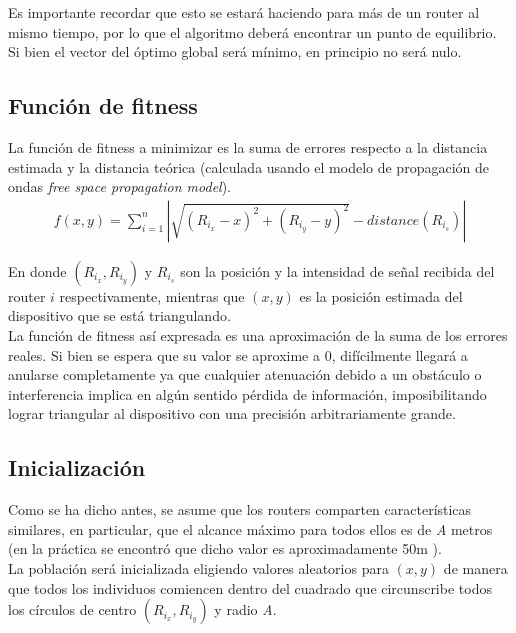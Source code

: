 \documentclass[journal]{IEEEtran}
\begin{document}
Es importante recordar que esto se estará haciendo para más de un router al mismo tiempo, por lo que el algoritmo deberá encontrar un punto de equilibrio. Si bien el vector del óptimo global será mínimo, en principio no será nulo.\\

\subsection{Función de fitness}

La función de fitness a minimizar es la suma de errores respecto a la distancia estimada y la distancia teórica (calculada usando el modelo de propagación de ondas \emph{free space propagation model}).\\

\begin{equation*}
\begin{split}
f(x, y) = \sum_{i=1}^{n} |\sqrt{(R_{i_x}-x)^2 + (R_{i_y}-y)^2} - distance(R_{i_s})|
\end{split}
\end{equation*}

En donde $(R_{i_x},R_{i_y})$ y $R_{i_s}$ son la posición y la intensidad de señal recibida del router $i$ respectivamente, mientras que $(x,y)$ es la posición estimada del dispositivo que se está triangulando.\\

La función de fitness así expresada es una aproximación de la suma de los errores reales. Si bien se espera que su valor se aproxime a 0, difícilmente llegará a anularse completamente ya que cualquier atenuación debido a un obstáculo o interferencia implica en algún sentido pérdida de información, imposibilitando lograr triangular al dispositivo con una precisión arbitrariamente grande.

\subsection{Inicialización}

Como se ha dicho antes, se asume que los routers comparten características similares, en particular, que el alcance máximo para todos ellos es de \textit{A} metros (en la práctica se encontró que dicho valor es aproximadamente 50m \cite{routers:range}).\\

La población será inicializada eligiendo valores aleatorios para $(x,y)$ de manera que todos los individuos comiencen dentro del cuadrado que circunscribe todos los círculos de centro $(R_{i_x}, R_{i_y})$ y radio \textit{A}.\\
\end{document}
